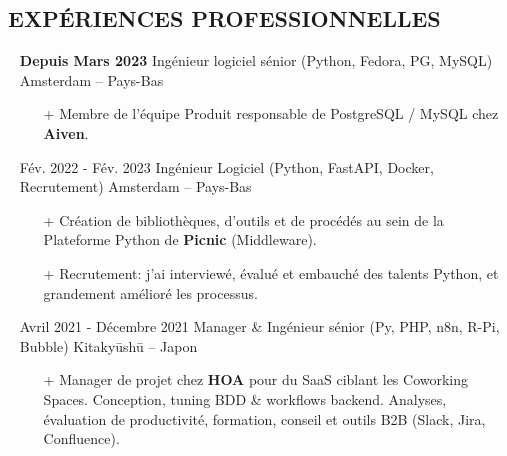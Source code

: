 \documentclass{res}
\begin{document}
  
\ifisanon
    \address{Des sections ont \'et\'e enlev\'ees. Elles sont indiqu\'ees par un \textit{(Anonyme)}}
\else
    \address{ \faMapMarker*~Pietersbergweg 53-B, 1105 BM, Amsterdam, Pays-Bas ~~ \faPassport~Fran\c{c}ais \\ \faAt~samuel@giffard.co ~~ \faMobile*~+33 (0) 7-69-69-12-02 ~~ \faMobile*~+31 (0) 6-8348-5505 ~~ \faWhatsapp~+32 (0) 4-84-14-10-33 \\ \\ \textbf{\faPython~Formateur, Ing\'enieur \& \'Evang\'eliste Python}  }
\fi

\begin{resume}

\section{\faBriefcase~EXP\'ERIENCES PROFESSIONNELLES}
    \begin{itemize}
        \item[] \textbf{Depuis Mars 2023} \tabto{5cm} Ing\'enieur logiciel s\'enior (Python, Fedora, PG, MySQL) \hfill Amsterdam -- Pays-Bas
        \begin{itemize}
            \item[+] Membre de l'\'equipe Produit responsable de PostgreSQL / MySQL chez \textbf{Aiven}.
        \end{itemize}
        \item[] F\'ev. 2022 - F\'ev. 2023 \tabto{5cm} Ing\'enieur Logiciel (Python, FastAPI, Docker, Recrutement) \hfill Amsterdam -- Pays-Bas
        \begin{itemize}
            \item[+] Cr\'eation de biblioth\`eques, d'outils et de proc\'ed\'es au sein de la Plateforme Python de \textbf{Picnic} (Middleware).
            \item[+] Recrutement: j'ai interview\'e, \'evalu\'e et embauch\'e des talents Python, et grandement am\'elior\'e les processus.
        \end{itemize}
        \item[] Avril 2021 - D\'ecembre 2021 \tabto{5cm} Manager \& Ing\'enieur s\'enior (Py, PHP, n8n, R-Pi, Bubble) \hfill Kitaky\=ush\=u -- Japon
        \begin{itemize}
            \item[+] Manager de projet chez \textbf{HOA} pour du SaaS ciblant les Coworking Spaces. Conception, tuning BDD \& workflows backend. Analyses, \'evaluation de productivit\'e, formation, conseil et outils B2B (Slack, Jira, Confluence).

\end{itemize}
\end{itemize}
\end{resume}
\end{document}
